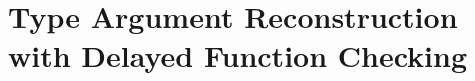 
\chapter{Type Argument Reconstruction with Delayed Function Checking}
\label{chapter:symbolic:directed-lti}

%

